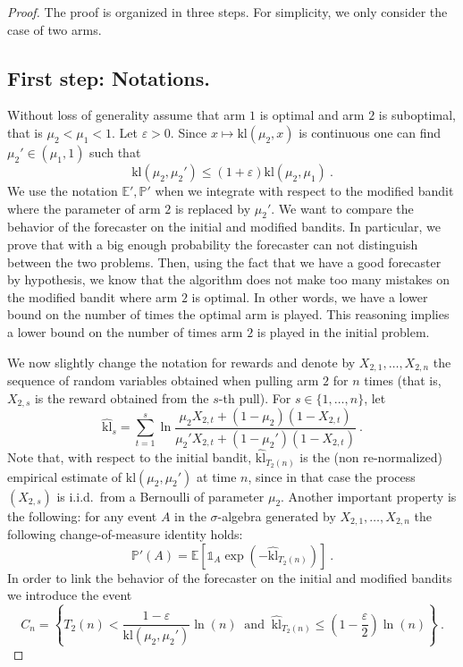 \documentclass[11pt]{hackednow}
\newcommand{\kl}{\mathrm{kl}}
\renewcommand{\P}{\mathbb{P}}
\newcommand{\E}{\mathbb{E}}
\def\ds1{\mathds{1}}
\renewcommand{\epsilon}{\varepsilon}
\begin{document}
\begin{proof}
The proof is organized in three steps. For simplicity, we only consider the case of two arms.

\subsection*{First step: Notations.}
Without loss of generality assume that arm $1$ is optimal and arm $2$ is suboptimal, that is $\mu_2 < \mu_1 < 1$. Let $\epsilon > 0$. Since $x \mapsto \kl(\mu_2,x)$ is continuous one can find $\mu_2' \in (\mu_1,1)$ such that
\begin{equation} \label{eq:defmu2prime}
\kl(\mu_2,\mu_2') \leq (1+\epsilon) \kl(\mu_2,\mu_1)~.
\end{equation}
We use the notation $\E', \P'$ when we integrate with respect to the modified bandit where the parameter of arm $2$ is replaced by $\mu_2'$. We want to compare the behavior of the forecaster on the initial and modified bandits. In particular, we prove that with a big enough probability the forecaster can not distinguish between the two problems. Then, using the fact that we have a good forecaster by hypothesis, we know that the algorithm does not make too many mistakes on the modified bandit where arm $2$ is optimal. In other words, we have a lower bound on the number of times the optimal arm is played. This reasoning implies a lower bound on the number of times arm $2$ is played in the initial problem.

We now slightly change the notation for rewards and denote by $X_{2,1}, \hdots, X_{2,n}$ the sequence of random variables obtained when pulling arm $2$ for $n$ times (that is, $X_{2,s}$ is the reward obtained from the $s$-th pull).
For $s \in \{1, \hdots, n\}$, let
$$\widehat{\kl}_s=\sum_{t=1}^{s} \ln \frac{\mu_2 X_{2,t} + (1-\mu_2) (1-X_{2,t})}{\mu_2' X_{2,t} + (1-\mu_2') (1-X_{2,t})}~.$$
Note that, with respect to the initial bandit, $\widehat{\kl}_{T_2(n)}$ is the (non re-normalized) empirical estimate of $\kl(\mu_2, \mu_2')$ at time $n$, since in that case the process $(X_{2,s})$ is i.i.d.\ from a Bernoulli of parameter $\mu_2$. Another important property is the following: for any event $A$ in the $\sigma$-algebra generated by $X_{2,1},\dots,X_{2,n}$ the following change-of-measure identity holds:
\begin{equation} \label{eq:KLchapeauprop}
\P'(A) = \E \left[\ds1_{A} \exp\left(- \widehat{\kl}_{T_2(n)} \right)\right]~.
\end{equation}
In order to link the behavior of the forecaster on the initial and modified bandits we introduce the event
\begin{equation} \label{eq:cndef}
C_n = \left\{ T_2(n) < \frac{1-\epsilon}{\kl(\mu_2,\mu_2')} \ln(n) \;\; \text{and} \;\; \widehat{\kl}_{T_2(n)} \leq \left(1-\frac{\epsilon}{2}\right) \ln(n) \right\}~.
\end{equation}


\end{proof}
\end{document}
